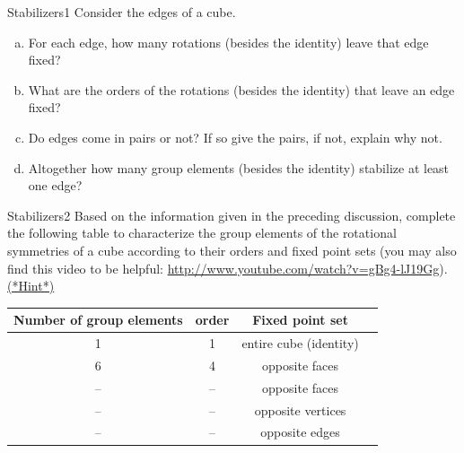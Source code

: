 \begin{exercise}{Stabilizers1}
Consider the edges of a cube.
\begin{enumerate}[(a)]
\item
For each edge, how many rotations (besides the identity) leave that edge fixed?
\item
What are the orders of the rotations (besides the identity) that leave an edge fixed?
\item
Do edges come in pairs or not?  If so give the pairs, if not, explain why not.
\item
Altogether how many group elements (besides the identity) stabilize at least one edge?
\end{enumerate}
\end{exercise}
\begin{exercise}{Stabilizers2}
Based on the information given in the preceding discussion, complete the following table to characterize the group elements of the rotational symmetries of a cube according to their orders and fixed point sets (you may also find this video to be helpful: \url{http://www.youtube.com/watch?v=gBg4-lJ19Gg}).
\hyperref[sec:GroupActions:Hints]{(*Hint*)}

\begin{tabular}{| c |c|c| r |}\hline
 \textbf{ Number of group elements} & \textbf{order} & \textbf{Fixed point set} \\ \hline
  1 & 1 & entire cube (identity) \\ \hline
  6 & 4 & opposite faces \\ \hline
 -- & -- & opposite faces \\ \hline
-- & -- & opposite vertices \\ \hline
-- & -- & opposite edges \\ \hline
\end{tabular}
\end{exercise}
